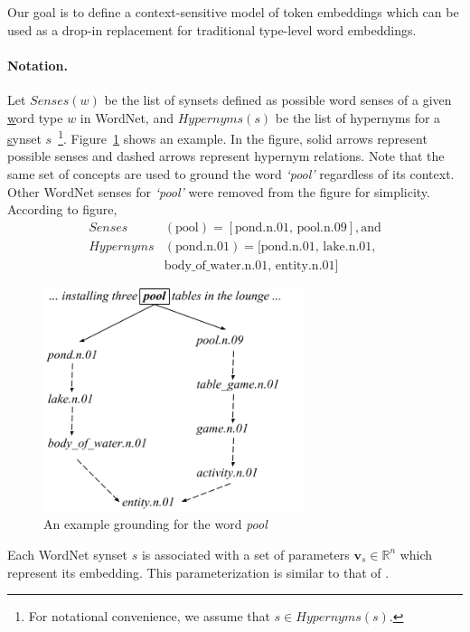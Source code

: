 Our goal is to define a context-sensitive model of token embeddings which can be used as a drop-in replacement for traditional type-level word embeddings.

\paragraph{Notation.}
Let $\textit{Senses}(w)$ be the list of synsets defined as possible word senses of a given \underline{w}ord type $w$ in WordNet, and $\textit{Hypernyms}(s)$ be the list of hypernyms for a \underline{s}ynset $s$~\footnote{For notational convenience, we assume that $s \in \textit{Hypernyms}(s)$.}. Figure~\ref{fig:ontolstm_wordnet_grounding} shows an example. In the figure, solid arrows
represent possible senses and dashed arrows represent hypernym relations. Note that the same set of concepts are used to ground the word \textit{`pool'} regardless of its context.
Other WordNet senses for \textit{`pool'} were removed from the figure for simplicity. According to figure, 
\begin{align}
\textit{Senses}&(\text{pool}) = [\text{pond.n.01, pool.n.09}], \text{and} \nonumber \\
\textit{Hypernyms}&(\text{pond.n.01}) = [\text{pond.n.01, lake.n.01}, \nonumber \\
&\text{body\_of\_water.n.01, entity.n.01}] \nonumber
\end{align}

\begin{figure}
\begin{center}
\includegraphics[width=3in]{figures/ontolstm_wordnet_grounding.png}
\caption{An example grounding for the word \textit{pool}}
\label{fig:ontolstm_wordnet_grounding}
\end{center}
\end{figure}
Each WordNet synset $s$ is associated with a set of parameters $\mathbf{v}_s \in \mathbb{R}^n$ which represent its embedding. 
This parameterization is similar to that of \cite{rothe:15}.

